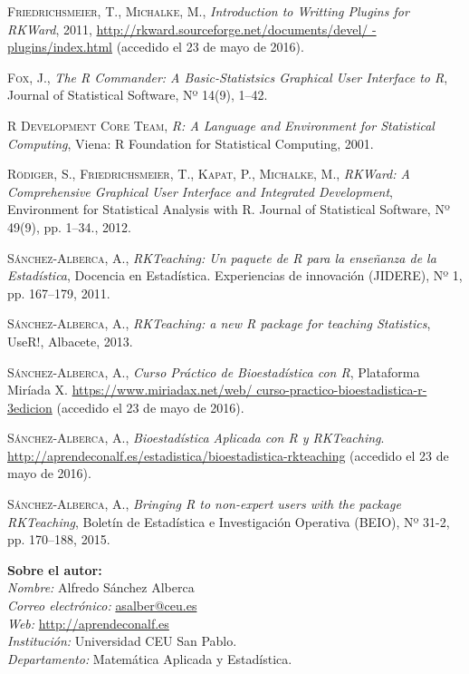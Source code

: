 \documentclass[a4paper,10pt,twoside]{article}
\begin{document}
\begin{thebibliography}{9}

\textsc{Friedrichsmeier}, T., \textsc{Michalke}, M., \textit{Introduction to Writting Plugins
for RKWard}, 2011, \url{http://rkward.sourceforge.net/documents/devel/
-plugins/index.html} (accedido el 23 de mayo de 2016).

\textsc{Fox}, J., \textit{The R Commander: A Basic-Statistsics Graphical User Interface to R}, Journal
of Statistical Software, Nº 14(9), 1--42.

\textsc{R Development Core Team}, \textit{R: A Language and Environment for Statistical Computing}, Viena: R Foundation
for Statistical Computing, 2001. 

\textsc{Rödiger}, S., \textsc{Friedrichsmeier}, T., \textsc{Kapat}, P., \textsc{Michalke}, M., \textit{RKWard: A
Comprehensive Graphical User Interface and Integrated Development}, Environment for Statistical Analysis
with R. Journal of Statistical Software, Nº 49(9), pp. 1--34., 2012.

\textsc{Sánchez-Alberca}, A., \textit{RKTeaching: Un paquete de R para la enseñanza de la Estadística}, Docencia en
Estadística. Experiencias de innovación (JIDERE), Nº 1, pp. 167--179, 2011.

\textsc{Sánchez-Alberca}, A., \textit{RKTeaching: a new R package for teaching Statistics}, UseR!, Albacete, 2013. 

\textsc{Sánchez-Alberca}, A., \textit{Curso Práctico de Bioestadística con R}, Plataforma Miríada X.
\url{https://www.miriadax.net/web/ curso-practico-bioestadistica-r-3edicion} (accedido el 23 de mayo de 2016).

\textsc{Sánchez-Alberca}, A., \textit{Bioestadística Aplicada con R y RKTeaching}.
\url{http://aprendeconalf.es/estadistica/bioestadistica-rkteaching} (accedido el 23 de mayo de 2016).

\textsc{Sánchez-Alberca}, A., \textit{Bringing R to non-expert users with the package RKTeaching}, Boletín de
Estadística e Investigación Operativa (BEIO), Nº 31-2, pp. 170--188, 2015.

\end{thebibliography}


\vspace{1cm}
\noindent\textbf{Sobre el autor:}\\
\emph{Nombre:} Alfredo Sánchez Alberca\\
\emph{Correo electrónico:} \href{mailto:asalber@ceu.es}{asalber@ceu.es}\\
\emph{Web:} \url{http://aprendeconalf.es}\\
\emph{Institución:} Universidad CEU San Pablo.\\
\emph{Departamento:} Matemática Aplicada y Estadística.
\end{document}
